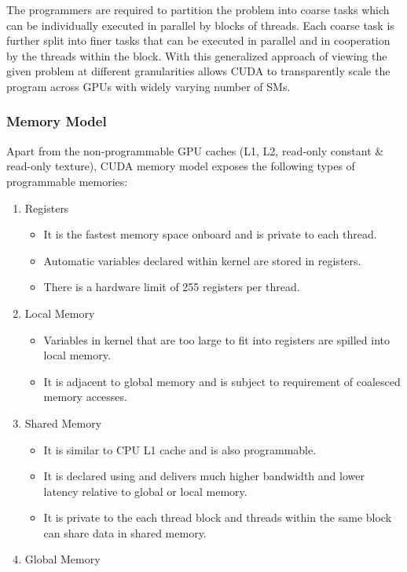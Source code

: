 \documentclass[thesis.tex]{subfiles}
\begin{document}
The programmers are required to partition the problem into coarse tasks which can be individually executed in parallel by blocks of threads. Each coarse task is further split into finer tasks that can be executed in parallel and in cooperation by the threads within the block. With this generalized approach of viewing the given problem at different granularities allows CUDA to transparently scale the program across GPUs with widely varying number of SMs. 

\subsubsection{Memory Model}
Apart from the non-programmable GPU caches (L1, L2, read-only constant \& read-only texture), CUDA memory model exposes the following types of programmable memories:
\begin{enumerate}
	\item Registers
	\begin{itemize}
		\item It is the fastest memory space onboard and is private to each thread. 
		\item Automatic variables declared within kernel are stored in registers.
		\item There is a hardware limit of 255 registers per thread.
	\end{itemize}
	\item Local Memory
	\begin{itemize}
		\item Variables in kernel that are too large to fit into registers are spilled into local memory.
		\item It is adjacent to global memory and is subject to requirement of coalesced memory accesses.
	\end{itemize}
	\item Shared Memory
	\begin{itemize}
		\item It is similar to CPU L1 cache and is also programmable.
		\item It is declared using  and delivers much higher bandwidth and lower latency relative to global or local memory.
		\item It is private to the each thread block and threads within the same block can share data in shared memory.
	\end{itemize}
	\item Global Memory
	\begin{itemize}

\end{itemize}
\end{enumerate}
\end{document}
